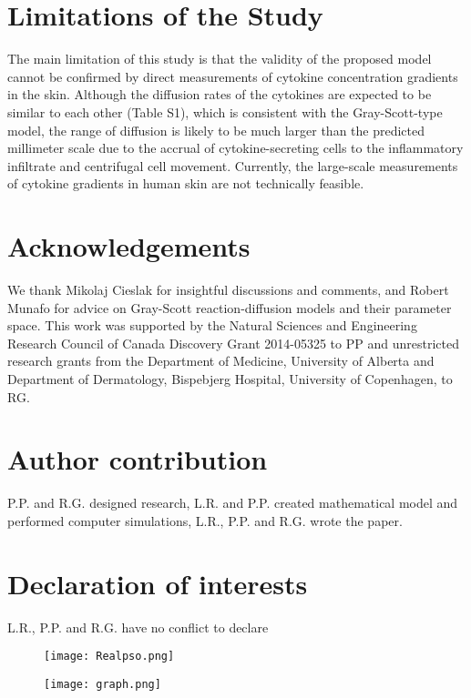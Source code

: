 \section{Limitations of the Study}
The main limitation of this study is that the validity of the proposed model cannot be confirmed by direct measurements of cytokine concentration gradients in the skin. Although the diffusion rates of the cytokines are expected to be similar to each other (Table S1), which is consistent with the Gray-Scott-type model, the range of diffusion is likely to be much larger than the predicted millimeter scale due to the accrual of cytokine-secreting cells to the inflammatory infiltrate and centrifugal cell movement. Currently, the large-scale measurements of cytokine gradients in human skin are not technically feasible. 

\section{Acknowledgements}
We thank Mikolaj Cieslak for insightful discussions and comments, and Robert Munafo for advice on Gray-Scott reaction-diffusion models and their parameter space. This work was supported by the Natural Sciences and Engineering Research Council of Canada Discovery Grant 2014-05325 to PP and unrestricted research grants from the Department of Medicine, University of Alberta and Department of Dermatology, Bispebjerg Hospital, University of Copenhagen, to RG.

\section{Author contribution}
P.P. and R.G. designed research, L.R. and P.P. created mathematical model and performed computer simulations, L.R., P.P. and R.G. wrote the paper. 

\section{Declaration of interests}
L.R., P.P. and R.G. have no conflict to declare

\begin{figure}[h]
	\centering
	\texttt{[image: Realpso.png]}
	\label{fig:pso1}
\end{figure}
		
\begin{figure}[h]
	\centering
	\texttt{[image: graph.png]}
	\label{fig:pso2}
\end{figure}
	

